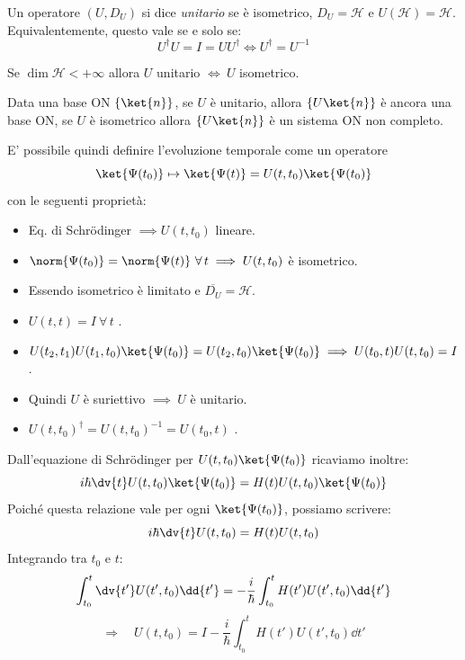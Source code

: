 \begin{definition}
    Un operatore \((U, D_U)\) si dice \textit{unitario} se è isometrico, \(D_U = \mathcal{H}\) e \(U(\mathcal{H})= \mathcal{H}\).
    Equivalentemente, questo vale se e solo se:
    \begin{equation}
        U^\dagger U = I = UU^\dagger \iff U^\dagger = U^{-1}
    \end{equation}
\end{definition}

\begin{remark}
    Se \(\dim \mathcal{H}< +\infty\) allora \(U\) unitario \(\iff \ U\) isometrico.
\end{remark}

\begin{remark}
    Data una base ON \(\left\{ \ket{n} \right\}\), se \(U\) è unitario, allora \(\left\{ U\ket{n} \right\}\) è ancora una base ON, 
    se \(U\) è isometrico allora \(\left\{ U\ket{n} \right\}\) è un sistema ON non completo.
\end{remark}

E' possibile quindi definire l'evoluzione temporale come un operatore
\begin{equation}
    \ket{\Psi(t_0)}\mapsto \ket{\Psi(t)}= U(t, t_0)\ket{\Psi(t_0)}
\end{equation}
con le seguenti proprietà:
\begin{itemize}
    \item Eq. di Schrödinger \(\implies U(t, t_0)\) lineare.
    \item \(\norm{\Psi(t_0)}= \norm{\Psi(t)} \ \forall\,t \implies U(t,t_0)\) è isometrico.
    \item Essendo isometrico è limitato e \(\overline{D_U}= \mathcal{H}\).
    \item \(U(t,t) = I \ \forall\,t\) .
    \item \(U(t_2,t_1)U(t_1,t_0)\ket{\Psi(t_0)}= U(t_2,t_0)\ket{\Psi(t_0)} \implies  U (t_0,t)U(t,t_0)= I\) .
    \item Quindi \(U\) è suriettivo \(\implies \ U \) è unitario.
    \item \( U(t,t_0)^\dagger= U(t,t_0)^{-1}= U(t_0,t)\) .
\end{itemize}

Dall'equazione di Schrödinger per \(U(t,t_0)\ket{\Psi(t_0)}\) ricaviamo inoltre:
\[
i\hbar \dv{t} U(t,t_0)\ket{\Psi(t_0)} = H(t)U(t,t_0)\ket{\Psi(t_0)}
\]
Poiché questa relazione vale per ogni \(\ket{\Psi(t_0)}\), possiamo scrivere:
\[
i\hbar \dv{t} U(t,t_0) = H(t)U(t,t_0)
\]
Integrando tra \(t_0\) e \(t\):
\[
\int_{t_0}^{t} \dv{t'} U(t',t_0)\dd{t'} = -\frac{i}{\hbar}\int_{t_0}^{t} H(t')U(t',t_0)\dd{t'}
\]
\[
\Rightarrow \quad U(t,t_0) = I - \frac{i}{\hbar}\int_{t_0}^{t} H(t')U(t',t_0)\dd{t'}
\]

